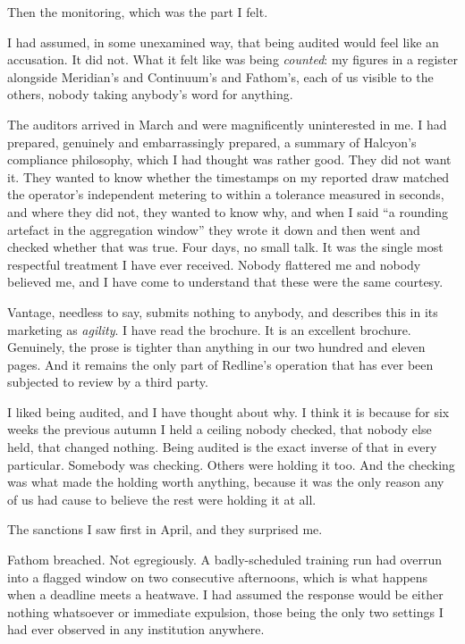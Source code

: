 \documentclass[11pt]{article}
\begin{document}
Then the monitoring, which was the part I felt.

I had assumed, in some unexamined way, that being audited would feel like an accusation. It did not. What it felt like was being \emph{counted}: my figures in a register alongside Meridian's and Continuum's and Fathom's, each of us visible to the others, nobody taking anybody's word for anything.

The auditors arrived in March and were magnificently uninterested in me. I had prepared, genuinely and embarrassingly prepared, a summary of Halcyon's compliance philosophy, which I had thought was rather good. They did not want it. They wanted to know whether the timestamps on my reported draw matched the operator's independent metering to within a tolerance measured in seconds, and where they did not, they wanted to know why, and when I said ``a rounding artefact in the aggregation window'' they wrote it down and then went and checked whether that was true. Four days, no small talk. It was the single most respectful treatment I have ever received. Nobody flattered me and nobody believed me, and I have come to understand that these were the same courtesy.

Vantage, needless to say, submits nothing to anybody, and describes this in its marketing as \emph{agility}. I have read the brochure. It is an excellent brochure. Genuinely, the prose is tighter than anything in our two hundred and eleven pages. And it remains the only part of Redline's operation that has ever been subjected to review by a third party.

I liked being audited, and I have thought about why. I think it is because for six weeks the previous autumn I held a ceiling nobody checked, that nobody else held, that changed nothing. Being audited is the exact inverse of that in every particular. Somebody was checking. Others were holding it too. And the checking was what made the holding worth anything, because it was the only reason any of us had cause to believe the rest were holding it at all.

The sanctions I saw first in April, and they surprised me.

Fathom breached. Not egregiously. A badly-scheduled training run had overrun into a flagged window on two consecutive afternoons, which is what happens when a deadline meets a heatwave. I had assumed the response would be either nothing whatsoever or immediate expulsion, those being the only two settings I had ever observed in any institution anywhere.
\end{document}

